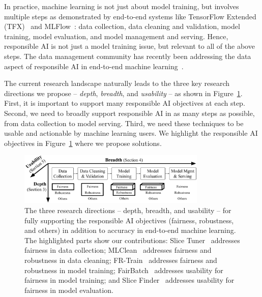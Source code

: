 \documentclass[11pt]{article}
\newcommand{\slicetuner}{Slice Tuner}
\newcommand{\frtrain}{FR-Train}
\newcommand{\fb}{FairBatch}
\newcommand{\mc}{MLClean}
\newcommand{\slicefinder}{Slice Finder}
\begin{document}
In practice, machine learning is not just about model training, but involves multiple steps as demonstrated by end-to-end systems like TensorFlow Extended (TFX)~\cite{DBLP:conf/kdd/BaylorBCFFHHIJK17} and MLFlow~\cite{DBLP:journals/debu/ZahariaCD0HKMNO18}: data collection, data cleaning and validation, model training, model evaluation, and model management and serving. Hence, responsible AI is not just a model training issue, but relevant to all of the above steps. The data management community has recently been addressing the data aspect of responsible AI in end-to-end machine learning~\cite{DBLP:conf/sigmod/Polyzotis0WZ17,DBLP:conf/sigmod/Kumar0017,DBLP:journals/sigmod/PolyzotisRWZ18,breck2019data,DBLP:journals/tkde/RohHW19,DBLP:journals/pvldb/AsudehJ20a,DBLP:journals/pvldb/Whang020}. 

\newpage
The current research landscape naturally leads to the three key research directions we propose -- {\em depth}, {\em breadth}, and {\em usability} -- as shown in  Figure~\ref{fig:responsibleai}. First, it is important to support many responsible AI objectives at each step. Second, we need to broadly support responsible AI in as many steps as possible, from data collection to model serving. Third, we need these techniques to be usable and actionable by machine learning users. 
We highlight the responsible AI objectives in Figure~\ref{fig:responsibleai} where we propose solutions.


\begin{figure}[t]
  \centering
  \includegraphics[width=0.8\textwidth]{submissions/responsible-ai/figs/responsibleai_ver2.pdf}
  \caption{The three research directions -- depth, breadth, and usability -- for fully supporting the responsible AI objectives (fairness, robustness, and others) in addition to accuracy in end-to-end machine learning. The highlighted parts show our contributions:  \slicetuner{}~\cite{DBLP:journals/corr/abs-2003-04549} addresses fairness in data collection; \mc{}~\cite{DBLP:conf/sigmod/TaeROKW19} addresses fairness and robustness in data cleaning; \frtrain{}~\cite{DBLP:conf/icml/RohLWS20} addresses fairness and robustness in model training; \fb{}~\cite{fairbatch} addresses usability for fairness in model training; and \slicefinder{}~\cite{DBLP:conf/icde/ChungKPTW19,DBLP:journals/tkde/ChungKPTW20} addresses usability for fairness in model evaluation.}
  \label{fig:responsibleai}
\end{figure}
\end{document}
